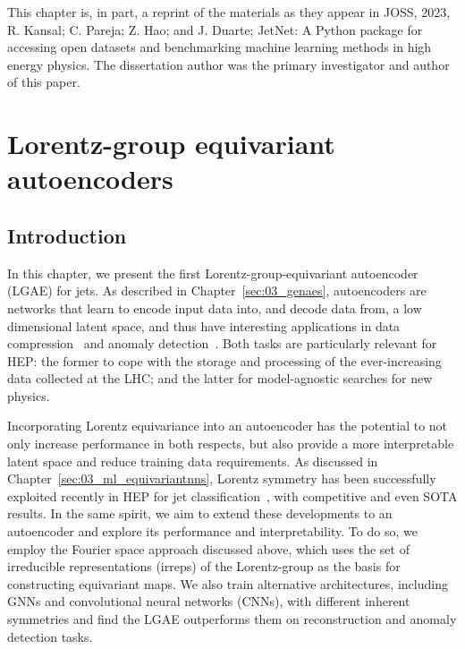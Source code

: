 This chapter is, in part, a reprint of the materials as they appear in
JOSS, 2023, R. Kansal; C. Pareja; Z. Hao; and J. Duarte; JetNet: A Python package for accessing open datasets and benchmarking machine learning methods in high energy physics.
The dissertation author was the primary investigator and author of this paper.



\chapter{Lorentz-group equivariant autoencoders}
\label{sec:06_lgae}

\section{Introduction}
\label{sec:06_lgae_intro}

In this chapter, we present the first Lorentz-group-equivariant autoencoder (LGAE) for jets.
As described in Chapter~\ref{sec:03_genaes}, autoencoders are networks that learn to encode input data into, and decode data from, a low dimensional latent space, and thus have interesting applications in data compression~\cite{AE-data-compression-1,AE-data-compression-2} and anomaly detection~\cite{AE-anomaly,Atkinson:2021nlt,VAE-anomaly-VAE,Tsan:2021brw,Farina-anomaly,Finke-anomaly,VAE-anomaly-latent-space,QUAK}.
Both tasks are particularly relevant for HEP: the former to cope with the storage and processing of the ever-increasing data collected at the LHC; and the latter for model-agnostic searches for new physics.

Incorporating Lorentz equivariance into an autoencoder has the potential to not only increase performance in both respects, but also provide a more interpretable latent space and reduce training data requirements.
As discussed in Chapter~\ref{sec:03_ml_equivariantnns}, Lorentz symmetry has been successfully exploited recently in HEP for jet classification~\cite{bogatskiy2020lorentz,LorentzNet,Li:2022xfc,Butter_2018}, with competitive and even SOTA results.
In the same spirit, we aim to extend these developments to an autoencoder and explore its performance and interpretability.
To do so, we employ the Fourier space approach discussed above, which uses the set of irreducible representations (irreps) of the Lorentz-group as the basis for constructing equivariant maps.
We also train alternative architectures, including GNNs and convolutional neural networks (CNNs), with different inherent symmetries and find the LGAE outperforms them on reconstruction and anomaly detection tasks.

